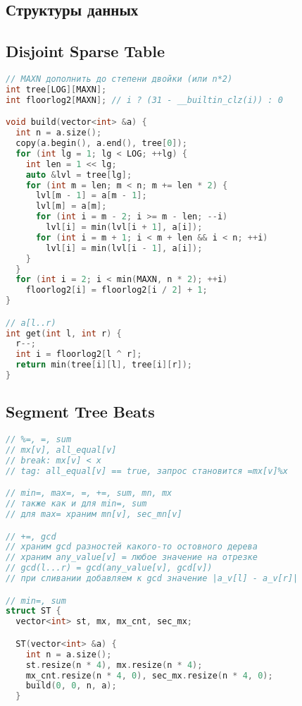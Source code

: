 \documentclass[9pt,a4paper,landscape,twosided]{extarticle}
\begin{document}
\begin{multicols*}{3}
\section{Структуры данных}

\subsection{Disjoint Sparse Table}
\begin{lstlisting}[language=C++]
// MAXN дополнить до степени двойки (или n*2)
int tree[LOG][MAXN];
int floorlog2[MAXN]; // i ? (31 - __builtin_clz(i)) : 0

void build(vector<int> &a) {
  int n = a.size();
  copy(a.begin(), a.end(), tree[0]);
  for (int lg = 1; lg < LOG; ++lg) {
    int len = 1 << lg;
    auto &lvl = tree[lg];
    for (int m = len; m < n; m += len * 2) {
      lvl[m - 1] = a[m - 1];
      lvl[m] = a[m];
      for (int i = m - 2; i >= m - len; --i)
        lvl[i] = min(lvl[i + 1], a[i]);
      for (int i = m + 1; i < m + len && i < n; ++i)
        lvl[i] = min(lvl[i - 1], a[i]);
    }
  }
  for (int i = 2; i < min(MAXN, n * 2); ++i)
    floorlog2[i] = floorlog2[i / 2] + 1;
}

// a[l..r)
int get(int l, int r) {
  r--;
  int i = floorlog2[l ^ r];
  return min(tree[i][l], tree[i][r]);
}

\end{lstlisting}

\subsection{Segment Tree Beats}
\begin{lstlisting}[language=C++]
// %=, =, sum
// mx[v], all_equal[v]
// break: mx[v] < x
// tag: all_equal[v] == true, запрос становится =mx[v]%x

// min=, max=, =, +=, sum, mn, mx
// также как и для min=, sum
// для max= храним mn[v], sec_mn[v]

// +=, gcd
// храним gcd разностей какого-то остовного дерева
// храним any_value[v] = любое значение на отрезке
// gcd(l...r) = gcd(any_value[v], gcd[v])
// при сливании добавляем к gcd значение |a_v[l] - a_v[r]|

// min=, sum
struct ST {
  vector<int> st, mx, mx_cnt, sec_mx;

  ST(vector<int> &a) {
    int n = a.size();
    st.resize(n * 4), mx.resize(n * 4);
    mx_cnt.resize(n * 4, 0), sec_mx.resize(n * 4, 0);
    build(0, 0, n, a);
  }


\end{lstlisting}
\end{multicols*}
\end{document}
